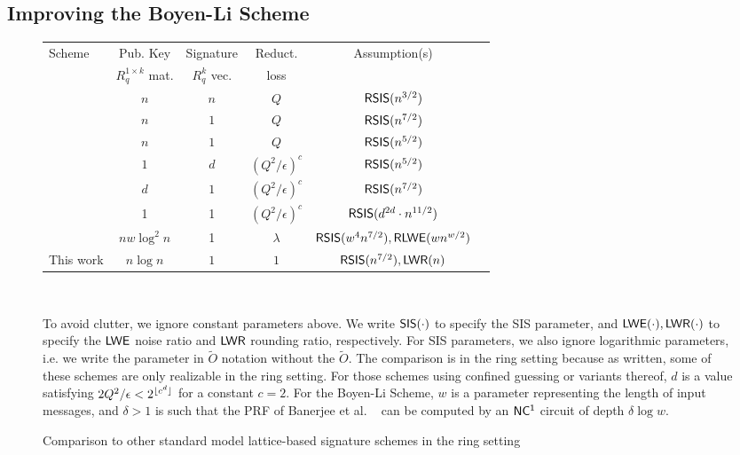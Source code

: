 \subsection{Improving the Boyen-Li Scheme}
\label{sec:an-improved-boyen}


\begin{figure}[ht]
\label{fig:results-comp}
{\centering
\begin{tabular}{|l|c|c|c|c|c|}
\hline
Scheme&Pub. Key&Signature&Reduct.&Assumption(s)\\
&$R_q^{1 \times k}$ mat.&$R_q^{k}$
vec.&loss&\\
\hline
\cite{DBLP:journals/joc/CashHKP12}&$n$&$n$&$Q$&$\mathsf{RSIS}(n^{3/2})$\\
\cite{DBLP:conf/pkc/Boyen10}&$n$&$1$&$Q$&$\mathsf{RSIS}(n^{7/2})$\\
\cite{DBLP:conf/eurocrypt/MicciancioP12}&$n$&$1$&$Q$&$\mathsf{RSIS}(n^{5/2})$\\
\cite{bohl2013confined}&$1$&$d$&$(Q^2/\epsilon)^c$&$\mathsf{RSIS}(n^{5/2})$\\
\cite{DBLP:conf/crypto/DucasM14}&$d$&$1$&$(Q^2/\epsilon)^c$&$\mathsf{RSIS}(n^{7/2})$\\
\cite{DBLP:conf/pkc/Alperin-Sheriff15}&1&1&$(Q^2/\epsilon)^c$&$\mathsf{RSIS}(d^{2d}\cdot
n^{11/2})$\\
\cite{DBLP:conf/asiacrypt/BoyenL16}&$nw\log^2{n}$&1&$\lambda$&$\mathsf{RSIS}(w^{4}n^{7/2}),\mathsf{RLWE}(wn^{w/2})$\\
\hline
This work&$n\log{n}$&$1$&$1$&$\mathsf{RSIS}(n^{7/2}),\mathsf{LWR}(n)$\\
\hline
\end{tabular}\\}
\medskip 

To avoid clutter, we ignore constant parameters above. We write $\mathsf{SIS}(\cdot)$ to specify the SIS parameter, and $\mathsf{LWE}(\cdot), \mathsf{LWR}(\cdot)$ to specify the $\mathsf{LWE}$ noise ratio and $\mathsf{LWR}$ rounding ratio, respectively. For SIS parameters, we also ignore logarithmic parameters, i.e. we write the parameter in $\tilde{O}$ notation without the $\tilde{O}$. 
The comparison is in the ring setting because as written, some of these schemes are only realizable in the ring setting. For those schemes
using confined guessing or variants thereof, $d$ is a value
satisfying $2Q^2/\epsilon < 2^{\lfloor c^d\rfloor}$ for a constant $c=2$. For the Boyen-Li Scheme, $w$ is a parameter representing the length of input messages, and $\delta>1$ is such that the PRF of Banerjee et al. ~\cite{DBLP:conf/eurocrypt/BanerjeePR12} can be computed by an $\mathsf{NC^{1}}$ circuit of depth $\delta \log{w}$.
\caption{Comparison to other standard model lattice-based signature
  schemes in the ring setting}
\end{figure}

